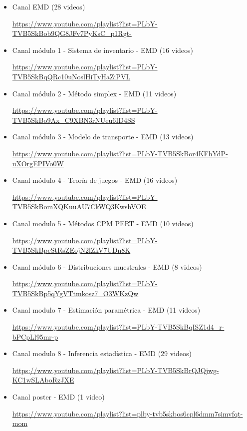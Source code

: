 \documentclass[oneside,spanish]{amsart}
\numberwithin{equation}{section}
\numberwithin{figure}{section}
\theoremstyle{definition}
\begin{document}
\begin{itemize}
	\item Canal EMD (28 videos)
	
	\url{https://www.youtube.com/playlist?list=PLbY-TVB5SkBob9QG8JFv7PyKsC_p1Rgt-}
	
	\item Canal módulo 1 - Sistema de inventario - EMD (16 videos)
	
	\url{https://www.youtube.com/playlist?list=PLbY-TVB5SkBqQRc10uNoslHiTyHaZiPVL}
	
	\item Canal módulo 2 - Método simplex - EMD (11 videos)
	
	\url{https://www.youtube.com/playlist?list=PLbY-TVB5SkBo9Ax_C9XBN3rNUeu6ID4SS}
	
	\item Canal módulo 3 - Modelo de transporte - EMD (13 videos)
	
	\url{https://www.youtube.com/playlist?list=PLbY-TVB5SkBor4KFhYdP-uXOrgEPIVo0W}
	
	\item Canal módulo 4 - Teoría de juegos - EMD (16 videos)
	
	\url{https://www.youtube.com/playlist?list=PLbY-TVB5SkBomXQKuuAU7CkWQ3KwshVOE}
	
	\item Canal modulo 5 - Métodos CPM PERT - EMD (10 videos)
	
	\url{https://www.youtube.com/playlist?list=PLbY-TVB5SkBpcStRsZEojN2lZkV7UDn8K}
	
	\item Canal módulo 6 - Distribuciones muestrales - EMD (8 videos)
	
	\url{https://www.youtube.com/playlist?list=PLbY-TVB5SkBp5qYgVTtmkosz7_O3WKzQw}
	
	\item Canal modulo 7 - Estimación paramétrica - EMD (11 videos)
	
	\url{https://www.youtube.com/playlist?list=PLbY-TVB5SkBqISZ1d4_r-bPCpLl95mr-p}
	
	\item Canal modulo 8 - Inferencia estadística - EMD (29 videos)
	
	\url{https://www.youtube.com/playlist?list=PLbY-TVB5SkBrQJQjwg-KC1wSLAboRzJXE}
	
	\item Canal poster - EMD (1 video)
	
	\url{https://www.youtube.com/playlist?list=plby-tvb5skbos6cpl6dmm7simvfqt-mom}
	

\end{itemize}
\end{document}
